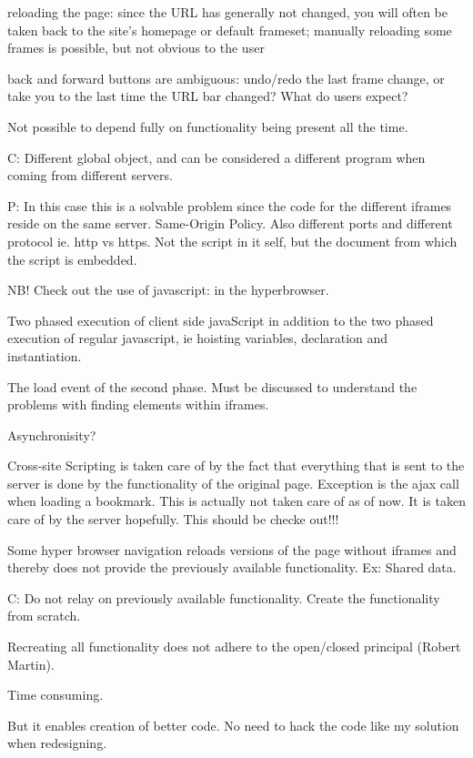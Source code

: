 \documentclass[english]{ifimaster}
\begin{document}
reloading the page: since the URL has generally not changed, you will often be taken back to the site's homepage or default frameset; manually reloading some frames is possible, but not obvious to the user

back and forward buttons are ambiguous: undo/redo the last frame change, or take you to the last time the URL bar changed? What do users expect?

Not possible to depend fully on functionality being present all the time.

C: Different global object, and can be considered a different program when coming from different servers.

P: In this case this is a solvable problem since the code for the different iframes reside on the same server. Same-Origin Policy. Also different ports and different protocol ie. http vs https. Not the script in it self, but the document from which the script is embedded.


NB! Check out the use of javascript: in the hyperbrowser.

Two phased execution of client side javaScript in addition to the two phased execution of regular javascript, ie hoisting variables, declaration and instantiation.

The load event of the second phase. Must be discussed to understand the problems with finding elements within iframes.

Asynchronisity? 

Cross-site Scripting is taken care of by the fact that everything that is sent to the server is done by the functionality of the original page. Exception is the ajax call when loading a bookmark. This is actually not taken care of as of now. It is taken care of by the server hopefully. This should be checke out!!!


Some hyper browser navigation reloads versions of the page without iframes and thereby does not provide the previously available functionality. Ex: Shared data.

C: Do not relay on previously available functionality. Create the functionality from scratch.

Recreating all functionality does not adhere to the open/closed principal (Robert Martin).

Time consuming.

But it enables creation of better code. No need to hack the code like my solution when redesigning.

\end{document}
